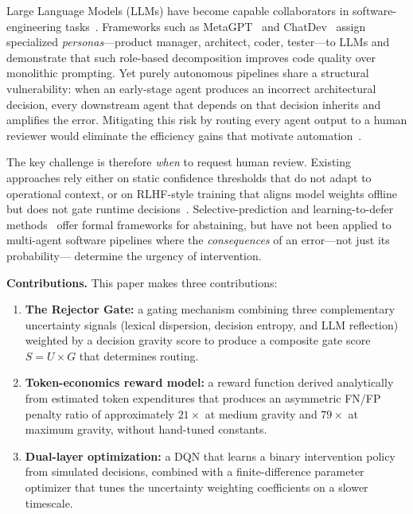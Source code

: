 \documentclass[conference]{IEEEtran}
\begin{document}
Large Language Models (LLMs) have become capable collaborators in
software-engineering tasks~\cite{brown2020gpt3,bubeck2023gpt4,hou2024llmse}.
Frameworks such as MetaGPT~\cite{hong2024metagpt} and
ChatDev~\cite{qian2024chatdev} assign specialized \emph{personas}---product
manager, architect, coder, tester---to LLMs and demonstrate that such
role-based decomposition improves code quality over monolithic prompting.
Yet purely autonomous pipelines share a structural vulnerability: when an
early-stage agent produces an incorrect architectural decision, every
downstream agent that depends on that decision inherits and amplifies the
error.
Mitigating this risk by routing every agent output to a human reviewer
would eliminate the efficiency gains that motivate
automation~\cite{horvitz1999principles,amershi2019guidelines}.

The key challenge is therefore \emph{when} to request human review.
Existing approaches rely either on static confidence thresholds that do not
adapt to operational context, or on RLHF-style training that aligns model
weights offline but does not gate runtime
decisions~\cite{christiano2017rlhf,ouyang2022instructgpt}.
Selective-prediction and learning-to-defer
methods~\cite{geifman2017selective,madras2018predict} offer formal frameworks
for abstaining, but have not been applied to multi-agent software pipelines
where the \emph{consequences} of an error---not just its probability---
determine the urgency of intervention.

\textbf{Contributions.} This paper makes three contributions:
\begin{enumerate}
  \item \textbf{The Rejector Gate:} a gating mechanism combining three
        complementary uncertainty signals (lexical dispersion, decision
        entropy, and LLM reflection) weighted by a decision gravity score
        to produce a composite gate score $S = U \times G$ that determines
        routing.
  \item \textbf{Token-economics reward model:} a reward function derived
        analytically from estimated token expenditures that produces an
        asymmetric FN/FP penalty ratio of approximately $21\times$ at medium
        gravity and $79\times$ at maximum gravity, without hand-tuned
        constants.
  \item \textbf{Dual-layer optimization:} a DQN that learns a binary
        intervention policy from simulated decisions, combined with a
        finite-difference parameter optimizer that tunes the uncertainty
        weighting coefficients on a slower timescale.
\end{enumerate}
\end{document}
